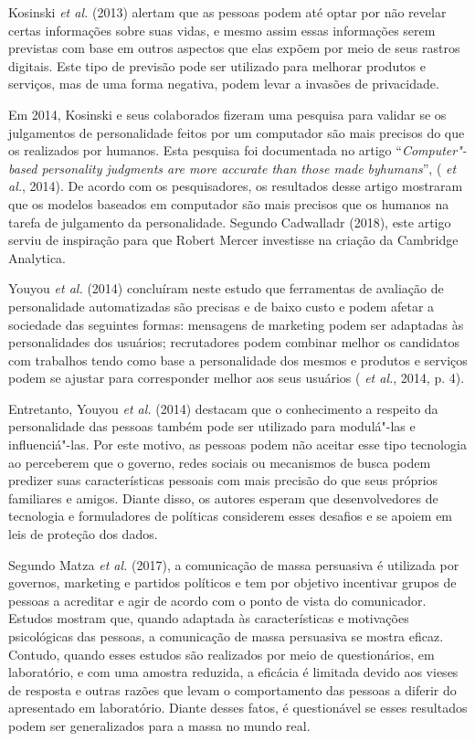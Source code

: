 Kosinski \emph{et al.} (2013) alertam que as pessoas podem até optar por não
revelar certas informações sobre suas vidas, e mesmo assim essas
informações serem previstas com base em outros aspectos que elas expõem
por meio de seus rastros digitais. Este tipo de previsão pode ser
utilizado para melhorar produtos e serviços, mas de uma forma negativa,
podem levar a invasões de privacidade.

Em 2014, Kosinski e seus colaborados fizeram uma pesquisa para validar
se os julgamentos de personalidade feitos por um computador são mais
precisos do que os realizados por humanos. Esta pesquisa foi documentada
no artigo ``\emph{Computer"-based personality judgments are more accurate
than those made byhumans}'', ( \emph{et al.}, 2014). De acordo com os
pesquisadores, os resultados desse artigo mostraram que os modelos
baseados em computador são mais precisos que os humanos na tarefa de
julgamento da personalidade. Segundo Cadwalladr (2018), este artigo
serviu de inspiração para que Robert Mercer investisse na criação da
Cambridge Analytica.

Youyou \emph{et al.} (2014) concluíram neste estudo que ferramentas de avaliação
de personalidade automatizadas são precisas e de baixo custo e podem
afetar a sociedade das seguintes formas: mensagens de marketing podem
ser adaptadas às personalidades dos usuários; recrutadores podem
combinar melhor os candidatos com trabalhos tendo como base a
personalidade dos mesmos e produtos e serviços podem se ajustar para
corresponder melhor aos seus usuários ( \emph{et al.}, 2014, p. 4).

Entretanto, Youyou \emph{et al.} (2014) destacam que o conhecimento a respeito
da personalidade das pessoas também pode ser utilizado para modulá"-las e
influenciá"-las. Por este motivo, as pessoas podem não aceitar esse tipo
tecnologia ao perceberem que o governo, redes sociais ou mecanismos de
busca podem predizer suas características pessoais com mais precisão do
que seus próprios familiares e amigos. Diante disso, os autores esperam
que desenvolvedores de tecnologia e formuladores de políticas considerem
esses desafios e se apoiem em leis de proteção dos dados.

Segundo Matza \emph{et al.} (2017), a comunicação de massa persuasiva é
utilizada por governos, marketing e partidos políticos e tem por
objetivo incentivar grupos de pessoas a acreditar e agir de acordo com o
ponto de vista do comunicador. Estudos mostram que, quando adaptada às
características e motivações psicológicas das pessoas, a comunicação de
massa persuasiva se mostra eficaz. Contudo, quando esses estudos são
realizados por meio de questionários, em laboratório, e com uma amostra
reduzida, a eficácia é limitada devido aos vieses de resposta e outras
razões que levam o comportamento das pessoas a diferir do apresentado em
laboratório. Diante desses fatos, é questionável se esses resultados
podem ser generalizados para a massa no mundo real.

